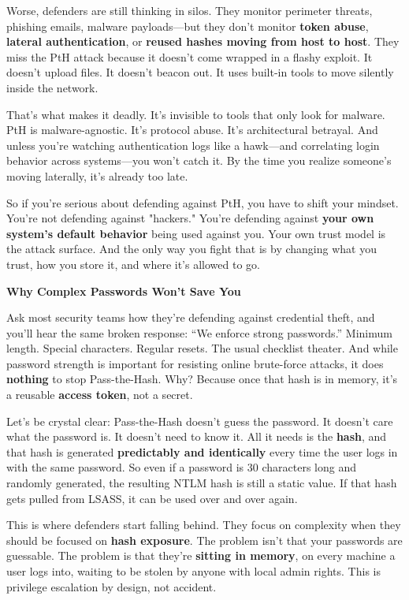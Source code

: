 Worse, defenders are still thinking in silos. They monitor perimeter threats, phishing emails, malware payloads—but they don’t monitor \textbf{token abuse}, \textbf{lateral authentication}, or \textbf{reused hashes moving from host to host}. They miss the PtH attack because it doesn’t come wrapped in a flashy exploit. It doesn’t upload files. It doesn’t beacon out. It uses built-in tools to move silently inside the network.

That’s what makes it deadly. It’s invisible to tools that only look for malware. PtH is malware-agnostic. It's protocol abuse. It's architectural betrayal. And unless you're watching authentication logs like a hawk—and correlating login behavior across systems—you won’t catch it. By the time you realize someone’s moving laterally, it’s already too late.

So if you’re serious about defending against PtH, you have to shift your mindset. You’re not defending against "hackers." You’re defending against \textbf{your own system’s default behavior} being used against you. Your own trust model is the attack surface. And the only way you fight that is by changing what you trust, how you store it, and where it’s allowed to go.

\textbf{Why Complex Passwords Won’t Save You}

Ask most security teams how they’re defending against credential theft, and you’ll hear the same broken response: “We enforce strong passwords.” Minimum length. Special characters. Regular resets. The usual checklist theater. And while password strength is important for resisting online brute-force attacks, it does \textbf{nothing} to stop Pass-the-Hash. Why? Because once that hash is in memory, it's a reusable \textbf{access token}, not a secret.

Let’s be crystal clear: Pass-the-Hash doesn't guess the password. It doesn't care what the password is. It doesn't need to know it. All it needs is the \textbf{hash}, and that hash is generated \textbf{predictably and identically} every time the user logs in with the same password. So even if a password is 30 characters long and randomly generated, the resulting NTLM hash is still a static value. If that hash gets pulled from LSASS, it can be used over and over again.

This is where defenders start falling behind. They focus on complexity when they should be focused on \textbf{hash exposure}. The problem isn’t that your passwords are guessable. The problem is that they’re \textbf{sitting in memory}, on every machine a user logs into, waiting to be stolen by anyone with local admin rights. This is privilege escalation by design, not accident.

